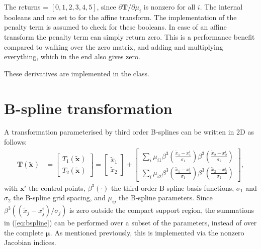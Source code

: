 \documentclass{InsightArticle}
\newcommand{\vT}{\bm{T}}
\newcommand{\vmu}{\bm{\mu}}
\newcommand{\vx}[1][]{\bm{x}_{#1}}
\newcommand{\vxt}[1][]{\bm{\widetilde x}_{#1}}
\newcommand{\Dinl}[2]{\partial #1 / \partial #2}
\begin{document}
The  returns
 = $[ 0, 1, 2, 3, 4, 5 ]$, since
$\Dinl{\vT}{\mu_i}$ is nonzero for all $i$. The internal booleans
 and
 are set to 
for the affine transform. The implementation of the penalty term is
assumed to check for these booleans. In case of an affine transform
the penalty term can simply return zero. This is a performance
benefit compared to walking over the zero matrix, and adding and
multiplying everything, which in the end also gives zero.

These derivatives are implemented in the
 class.


\section{B-spline transformation}\label{sec:bspline}

A transformation parameterised by third order B-splines can be
written in 2D as follows:
\begin{align}
\vT(\vxt) &= \begin{bmatrix} T_1(\vxt) \\ T_2(\vxt)
\end{bmatrix} = \begin{bmatrix} \widetilde{x}_1 \\ \widetilde{x}_2 \end{bmatrix}
 + \begin{bmatrix} \sum_{i} \mu_{i1} \beta^3 \left(
\frac{ \widetilde{x}_1 - x_{1}^i}{\sigma_1} \right)
\beta^3 \left( \frac{\widetilde{x}_2 - x_{2}^i}{\sigma_2}\right) \\
 \sum_{i} \mu_{i2} \beta^3 \left( \frac{ \widetilde{x}_1 - x_{1}^i}
 {\sigma_1} \right) \beta^3 \left( \frac{\widetilde{x}_2 - x_{2}^i}{\sigma_2} \right)
\end{bmatrix},\label{eq:bspline}
\end{align}
with $\vx^i$ the control points, $\beta^3(\cdot)$ the third-order
B-spline basis functions, $\sigma_1$ and $\sigma_2$ the B-spline
grid spacing, and $\mu_{ij}$ the B-spline parameters. Since $\beta^3
\left( ( \widetilde{x}_j - x_{j}^i ) / \sigma_j \right)$ is zero
outside the compact support region, the summations in
(\ref{eq:bspline}) can be performed over a subset of the parameters,
instead of over the complete $\vmu$. As mentioned previously, this
is implemented via the nonzero Jacobian indices.
\end{document}
